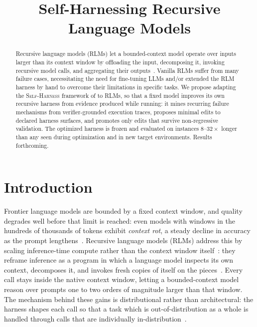 \documentclass{article}
\title{Self-Harnessing Recursive Language Models}
\newcommand{\rlms}{\textsc{RLM}s\xspace}
\newcommand{\sh}{\textsc{Self-Harness}\xspace}
\begin{document}
\maketitle

\begin{abstract}
Recursive language models (\rlms) let a bounded-context model operate over inputs larger
than its context window by offloading the input, decomposing it, invoking recursive model
calls, and aggregating their outputs~\citep{zhang2025rlm}. Vanilla RLMs suffer from many failure
cases, necessitating the need for fine-tuning LLMs and/or extended the RLM harness by hand to overcome 
their limitations in specific tasks. We propose adapting the \sh{} framework of \citet{zhang2026selfharness} to \rlms, so that a fixed model improves its own recursive harness from evidence produced while running: it mines recurring failure mechanisms from verifier-grounded execution traces, proposes minimal edits to declared harness surfaces, and promotes only edits that survive non-regressive
validation. The optimized harness is frozen and evaluated on instances $8$--$32\times$
longer than any seen during optimization and in new target environments. Results forthcoming.
\end{abstract}

\section{Introduction}
Frontier language models are bounded by a fixed context window, and quality degrades well
before that limit is reached: even models with windows in the hundreds of thousands of
tokens exhibit \emph{context rot}, a steady decline in accuracy as the prompt
lengthens~\citep{hong2025contextrot}. Recursive language models (\rlms) address this by
scaling inference-time compute rather than the context window itself~\citep{snell2024scaling}:
they reframe inference as a program in which a language model inspects its own context,
decomposes it, and invokes fresh copies of itself on the pieces~\citep{zhang2025rlm}. Every
call stays inside the native context window, letting a bounded-context model reason over
prompts one to two orders of magnitude larger than that window. The mechanism behind these
gains is distributional rather than architectural: the harness shapes each call so that a
task which is out-of-distribution as a whole is handled through calls that are individually
in-distribution~\citep{zhang2026harness}.
\end{document}
